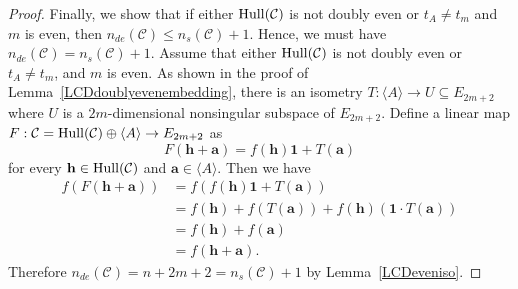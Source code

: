 \documentclass{article}
\theoremstyle{definition}
\theoremstyle{remark}
\begin{document}
\begin{proof}
    Finally, we show that if either ${\rm Hull}(\mathcal C)$ is not doubly even or $t_A\ne t_m$ and $m$ is even, then $n_{de}(\mathcal{C})\le n_s(\mathcal{C})+1$. Hence, we must have $n_{de}(\mathcal{C})= n_s(\mathcal{C})+1$. Assume that either ${\rm Hull}(\mathcal C)$ is not doubly even or $t_A\ne t_m$, and $m$ is even. As shown in the proof of Lemma~\ref{LCDdoublyevenembedding}, there is an isometry $T:\langle A\rangle\to U\subseteq E_{2m+2}$ where $U$ is a $2m$-dimensional nonsingular subspace of $E_{2m+2}$. Define a linear map $F:\mathcal{C}={\rm Hull}(\mathcal{C})\oplus\langle A\rangle\to E_{2m+2}$ as 
    \[
    F(\mathbf{h}+\mathbf{a})=f(\mathbf{h})\mathbf{1}+T(\mathbf{a})
    \]
    for every $\mathbf{h}\in {\rm Hull}(\mathcal{C})$ and $\mathbf{a}\in\langle A\rangle$. Then we have
    \begin{align*}
    f(F(\mathbf{h}+\mathbf{a}))&=f(f(\mathbf{h})\mathbf{1}+T(\mathbf{a}))\\&=f(\mathbf{h})+f(T(\mathbf{a}))+f(\mathbf{h})(\mathbf{1}\cdot T(\mathbf{a}))\\&=f(\mathbf{h})+f(\mathbf{a})\\&=f(\mathbf{h}+\mathbf{a}).
    \end{align*}
    Therefore $n_{de}(\mathcal{C})=n+2m+2=n_s(\mathcal{C})+1$ by Lemma~\ref{LCDeveniso}.
\end{proof}
\end{document}
